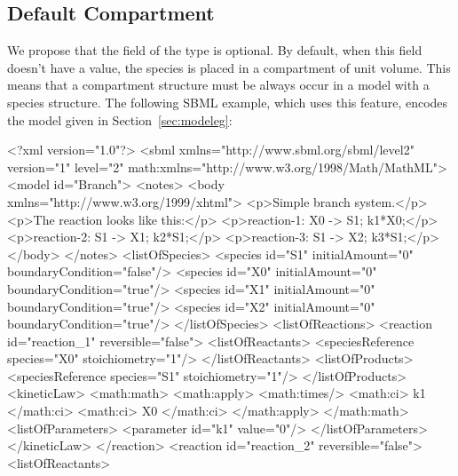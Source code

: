 \documentclass[10pt,twocolumntoc]{cekarticle}
\begin{document}
\subsection{Default Compartment}
\label{sec:defaultcompartment}
We propose that the  field of the  type is optional.  By default, when this field doesn't have a value, the species is placed in a compartment of unit volume.  This means that a compartment structure must be always occur in a model with a species structure.
The following SBML example, which uses this feature, encodes the model given in Section~\ref{sec:modeleg}:
\begin{example}
<?xml version="1.0"?>
<sbml xmlns="http://www.sbml.org/sbml/level2" version="1" level="2"
      math:xmlns="http://www.w3.org/1998/Math/MathML">
    <model id="Branch">
        <notes>
            <body xmlns="http://www.w3.org/1999/xhtml">
                <p>Simple branch system.</p>
                <p>The reaction looks like this:</p>
                <p>reaction-1:   X0 -> S1; k1*X0;</p>
                <p>reaction-2:   S1 -> X1; k2*S1;</p>
                <p>reaction-3:   S1 -> X2; k3*S1;</p>
            </body>
        </notes>
        <listOfSpecies>
            <species id="S1" initialAmount="0" boundaryCondition="false"/>
            <species id="X0" initialAmount="0" boundaryCondition="true"/>
            <species id="X1" initialAmount="0" boundaryCondition="true"/>
            <species id="X2" initialAmount="0" boundaryCondition="true"/>
        </listOfSpecies>
        <listOfReactions>
            <reaction id="reaction_1" reversible="false">
                <listOfReactants>
                    <speciesReference species="X0" stoichiometry="1"/>
                </listOfReactants>
                <listOfProducts>
                    <speciesReference species="S1" stoichiometry="1"/>
                </listOfProducts>
                <kineticLaw>
                    <math:math>
                        <math:apply>
                            <math:times/>
                            <math:ci> k1 </math:ci>
                            <math:ci> X0 </math:ci>
                        </math:apply>
                    </math:math>
                    <listOfParameters>
                        <parameter id="k1" value="0"/>
                    </listOfParameters>
                </kineticLaw>
            </reaction>
            <reaction id="reaction_2" reversible="false">
                <listOfReactants>

\end{example}
\end{document}
